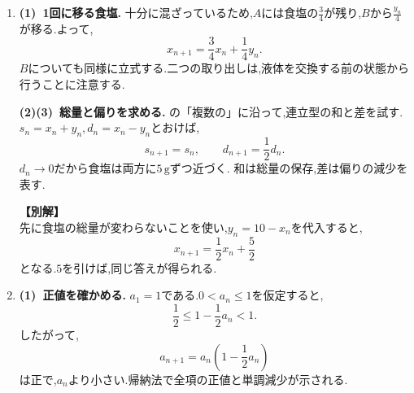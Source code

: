 \begin{enumerate}[label=\textbf{問\arabic*.},leftmargin=3.8em,format=\bookitemlink{practice-bridge}{solution}{problem}]
    \smallskip
    \textbf{(3)~和のを取る.}
    の「総和」に沿って,添字を一つずらした和を引く.\,
    $n\ge1$で,
    \[
      T_{n-1}=\sum_{k=0}^{n-1}(k+1)(n-k).
    \]
    両方にある項と,$T_n$にだけある最後の項を分けると,
    \begin{align*}
      T_n-T_{n-1}
      &=\sum_{k=0}^{n-1}(k+1)+(n+1)\\
      &=\frac{(n+1)(n+2)}2.
    \end{align*}
    この右辺は,連続する三つの整数の積を$6$で割った値の差
    \[
      \frac{(n+1)(n+2)(n+3)}6
      -\frac{n(n+1)(n+2)}6
    \]
    に等しい.したがって,$T_0=1$から帰納法で
    \[
      T_n=\frac{(n+1)(n+2)(n+3)}6
    \]
    を得る.和自体のを作り,各項の展開を省いた.

    \noindent \textbf{【別解】}\\
    玉$n$個と仕切り3本を一列に並べ,仕切りの間にある玉の数を順に$A,B,C,D$の個数とする.
    仕切りが隣り合う場合や端にある場合が,空の箱に対応する.\,
    $n+3$個の位置から仕切りの位置3個を選べばよいので,
    \[
      T_n=\binom{n+3}{3}
      =\frac{(n+1)(n+2)(n+3)}6.
    \]
    一つずつ増やす考え方と,一度に全体を数える考え方を比べてみよう.
  \item \textbf{(1)~1回に移る食塩.}
    十分に混ざっているため,$A$には食塩の$\frac{3}{4}$が残り,$B$から$\frac{y_n}{4}$が移る.よって,
    \[
      x_{n+1}=\frac34x_n+\frac14y_n.
    \]
    $B$についても同様に立式する.二つの取り出しは,液体を交換する前の状態から行うことに注意する.

    \smallskip
    \textbf{(2)(3)~総量と偏りを求める.}
    の「複数の」に沿って,連立型の和と差を試す.\,
    $s_n=x_n+y_n,d_n=x_n-y_n$とおけば,
    \[
      s_{n+1}=s_n,\qquad d_{n+1}=\frac12d_n.
    \]
    $d_n\to0$だから食塩は両方に$5\,\mathrm{g}$ずつ近づく.
    和は総量の保存,差は偏りの減少を表す.

    \noindent \textbf{【別解】}\\
    先に食塩の総量が変わらないことを使い,$y_n=10-x_n$を代入すると,
    \[
      x_{n+1}=\frac12x_n+\frac52
    \]
    となる.$5$を引けば,同じ答えが得られる.
  \item \textbf{(1)~正値を確かめる.}
    $a_1=1$である.$0<a_n\le1$を仮定すると,
    \[
      \frac12\le1-\frac12a_n<1.
    \]
    したがって,
    \[
      a_{n+1}=a_n\left(1-\frac12a_n\right)
    \]
    は正で,$a_n$より小さい.帰納法で全項の正値と単調減少が示される.


\end{enumerate}
